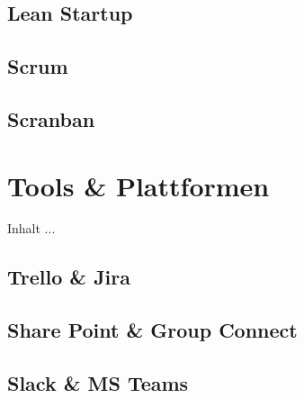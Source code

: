 \subsection{Lean Startup}

\subsection{Scrum}

\subsection{Scranban}

\section{Tools \& Plattformen}
Inhalt ...

\subsection{Trello \& Jira}

\subsection{Share Point \& Group Connect}

\subsection{Slack \& MS Teams}
